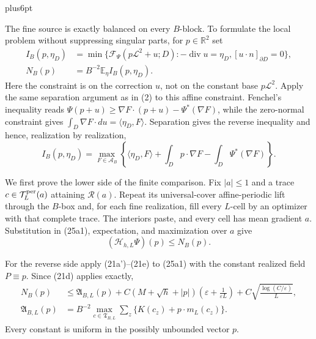 \documentclass[11pt,reqno]{amsart}
\makeatletter
\theoremstyle{plain}
\theoremstyle{definition}
\theoremstyle{remark}
\renewenvironment{proof}[1][\proofname]{%
  \par
  \pushQED{\qed}%
  \normalfont
  \topsep6pt plus6pt\relax
  \trivlist
  \item[\hskip\labelsep\slshape #1\@addpunct{.}]%
  \ignorespaces
}{%
  \popQED
  \endtrivlist
  \@endpefalse
}
\DeclareRobustCommand{\qed}{%
  \leavevmode\unskip\penalty9999\hbox{}\nobreak
  \ifmmode
    \makebox[0pt][l]{\qquad\hbox{\qedsymbol}}%
  \else
    \qquad\hbox{\qedsymbol}%
  \fi
}
\renewcommand{\qedsymbol}{\rule[.47pt]{4pt}{6pt}}
\numberwithin{equation}{section}
\newcommand{\1}{\mathbf 1}
\makeatother
\begin{document}
\begin{proof}
The fine source is exactly balanced on every $B$-block.  To formulate
the local problem without suppressing singular parts, for $p\in
\mathbb R^2$ set
\begin{equation}
\begin{split}
I_ B(p,\eta_ D)&=\min\{\mathcal F_ \Psi(p\mathcal L^2+u;D):
-\operatorname {div}u=\eta_ D, [u\cdot n]_ {\partial D}=0\},\\
N_ B(p)&=B^{-2}\mathbb E_ \eta I_ B(p,\eta_ D).                    
\end{split}
\tag{25a0}
\end{equation}
Here the constraint is on the correction $u$, not on the constant
base $p\mathcal L^2$.  Apply the same separation argument as in (2)
to this affine constraint.  Fenchel's inequality reads
$\Psi(p+u)\geq\nabla F\cdot(p+u)-\Psi^*(\nabla F)$, while the
zero-normal constraint gives
$\int_ D\nabla F\cdot du=\langle\eta_ D,F\rangle$.  Separation gives
the reverse inequality and hence, realization by realization,
\begin{equation}
I_ B(p,\eta_ D)=\max_ {F\in\mathscr A_ B}
\left\{\langle\eta_ D,F\rangle+
\int_ Dp\cdot\nabla F-\int_ D\Psi^*(\nabla F)\right\}.
\tag{25a1}
\end{equation}

We first prove the lower side of the finite comparison.  Fix
$|a|\leq1$ and a trace $c\in\mathcal T_ L^{\rm per}(a)$ attaining
$\mathcal R(a)$.  Repeat its universal-cover affine-periodic lift through the $B$-box
and, for each fine realization, fill every $L$-cell by an optimizer
with that complete trace.  The interiors paste, and every cell has mean
gradient $a$.  Substitution in (25a1), expectation, and maximization
over $a$ give
\begin{equation}
(\mathcal H_ {h,L}\Psi)(p)\leq N_ B(p).
\tag{25a2}
\end{equation}

For the reverse side apply (21a')--(21e) to (25a1) with the constant
realized field $P\equiv p$.  Since (21d) applies exactly,
\begin{align}
N_ B(p)&\leq \mathfrak A_ {B,L}(p)
+C(M+\sqrt h+|p|)
\left(\varepsilon+\frac1{\varepsilon L}\right)
+C\sqrt{\frac{\log(C/\varepsilon)}L},                         \tag{25a3}\\
\mathfrak A_ {B,L}(p)&=B^{-2}\max_ {c\in\mathfrak T_ {B,L}}
\sum_ z\{K(c_ z)+p\cdot m_ L(c_ z)\}.                       \tag{25a4}
\end{align}
Every constant is uniform in the possibly unbounded vector $p$.


\end{proof}
\end{document}
